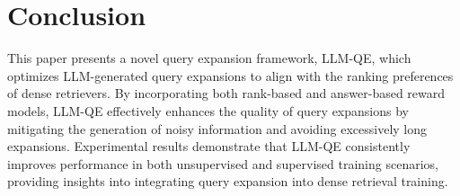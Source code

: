 \section{Conclusion}
This paper presents a novel query expansion framework, LLM-QE, which optimizes LLM-generated query expansions to align with the ranking preferences of dense retrievers. By incorporating both rank-based and answer-based reward models, LLM-QE effectively enhances the quality of query expansions by mitigating the generation of noisy information and avoiding excessively long expansions. 
Experimental results demonstrate that LLM-QE consistently improves performance in both unsupervised and supervised training scenarios, providing insights into integrating query expansion into dense retrieval training.